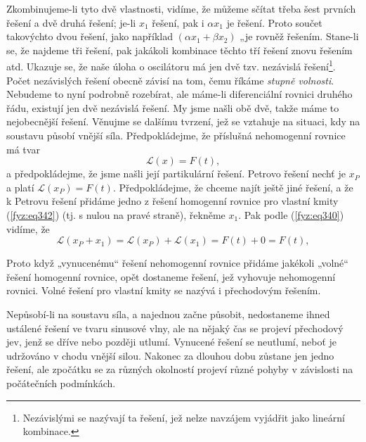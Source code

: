     
    Zkombinujeme-li tyto dvě vlastnosti, vidíme, že můžeme sčítat třeba šest prvních řešení a dvě 
    druhá řešení; je-li \(x_1\) řešení, pak i \(\alpha x_1\) je řešení. Proto součet takovýchto 
    dvou řešení, jako například \((\alpha x_1 + \beta x_2 )\) „je rovněž řešením. Stane-li se, že 
    najdeme tři řešení, pak jakákoli kombinace těchto tří řešení znovu řešením atd. Ukazuje se, že 
    naše úloha o oscilátoru má jen dvě tzv. nezávislá řešení\footnote{Nezávislými se nazývají ta 
    řešení, jež nelze navzájem vyjádřit jako lineární kombinace.}. Počet nezávislých řešení obecně 
    závisí na tom, čemu říkáme \emph{stupně volnosti}. Nebudeme to nyní podrobně rozebírat, ale 
    máme-li diferenciální rovnici druhého řádu, existují jen dvě nezávislá řešení. My jsme našli 
    obě dvě, takže máme to nejobecnější řešení. Věnujme se dalšímu tvrzení, jež se vztahuje na 
    situaci, kdy na soustavu působí vnější síla. Předpokládejme, že příslušná nehomogenní rovnice 
    má tvar
    \begin{equation}\label{fyz:eq343}
      \mathscr{L}(x) = F(t),
    \end{equation}
    a předpokládejme, že jsme našli její partikulární řešení. Petrovo řešení nechť je \(x_P\) a 
    platí \(\mathscr{L}(x_P) = F(t)\). Předpokládejme, že chceme najít ještě jiné řešení, a že k 
    Petrovu řešení přidáme jedno z řešení homogenní rovnice pro vlastní kmity (\ref{fyz:eq342}) 
    (tj. s nulou na pravé straně), řekněme \(x_1\). Pak podle (\ref{fyz:eq340}) vidíme, že
    \begin{equation}\label{fyz:eq344}
      \mathscr{L}(x_P + x_1) = \mathscr{L}(x_P) + \mathscr{L}(x_1) = F(t) + 0 = F(t),
    \end{equation}
    
    Proto když „vynucenému“ řešení nehomogenní rovnice přidáme jakékoli „volné“ řešení homogenní 
    rovnice, opět dostaneme řešení, jež vyhovuje nehomogenní rovnici. Volné řešení pro vlastní 
    kmity se nazývá i přechodovým řešením. 
    
    Nepůsobí-li na soustavu síla, a najednou začne působit, nedostaneme ihned ustálené řešení ve 
    tvaru sinusové vlny, ale na nějaký čas se projeví přechodový jev, jenž se dříve nebo později 
    utlumí. Vynucené řešení se neutlumí, neboť je udržováno v chodu vnější silou. Nakonec za 
    dlouhou dobu zůstane jen jedno řešení, ale zpočátku se za různých okolností projeví různé 
    pohyby v závislosti na počátečních podmínkách.
    
